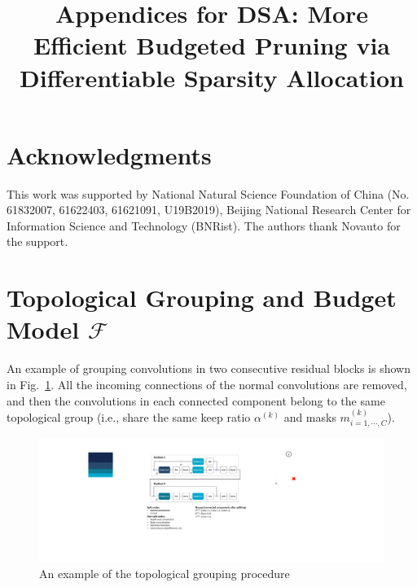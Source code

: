 \documentclass[runningheads]{llncs}
\newcommand{\flops}{\mathcal{F}}
\begin{document}
  \section*{Acknowledgments}
  This work was supported by National Natural Science Foundation of China (No. 61832007, 61622403, 61621091, U19B2019), 
  Beijing National Research Center for Information Science and Technology (BNRist). The authors thank Novauto for the support.


  \clearpage
  
 
  
  
  {}
  
  \clearpage

  \pagestyle{headings}
  \title{Appendices for DSA: More Efficient Budgeted Pruning via Differentiable Sparsity Allocation}
  \author{}
  \institute{}
  
  \maketitle
  
  \section{Topological Grouping and Budget Model $\flops$}
  
  An example of grouping convolutions in two consecutive residual blocks is shown in Fig.~\ref{fig:grouping}. All the incoming connections of the normal convolutions are removed, and then the convolutions in each connected component belong to the same topological group (i.e., share the same keep ratio $\alpha^{(k)}$ and masks ${m^{(k)}_{i=1,\cdots,C}}$).
  
  \begin{figure}[h]
  \begin{center}
  \includegraphics[width=0.85\linewidth]{figs/grouping.pdf}
  \caption{An example of the topological grouping procedure}
  \label{fig:grouping}
  \end{center}
  \end{figure}
\end{document}

